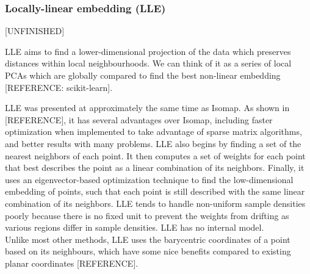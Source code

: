 \hfill
\subsubsection{Locally-linear embedding (LLE)}
[UNFINISHED]

LLE aims to find a lower-dimensional projection of the data which preserves distances within local neighbourhoods. We can think of it as a series of local PCAs which are globally compared to find the best non-linear embedding [REFERENCE: scikit-learn].



%


LLE was presented at approximately the same time as Isomap. 
As shown in [REFERENCE], it has several advantages over Isomap, including faster optimization when implemented to take advantage of sparse matrix algorithms, and better results with many problems. LLE also begins by finding a set of the nearest neighbors of each point. It then computes a set of weights for each point that best describes the point as a linear combination of its neighbors. Finally, it uses an eigenvector-based optimization technique to find the low-dimensional embedding of points, such that each point is still described with the same linear combination of its neighbors. LLE tends to handle non-uniform sample densities poorly because there is no fixed unit to prevent the weights from drifting as various regions differ in sample densities. LLE has no internal model.\\
Unlike most other methods, LLE uses the barycentric coordinates of a point based on its neighbours, which have some nice benefits compared to existing planar coordinates [REFERENCE].

